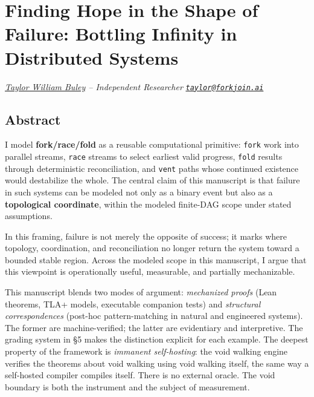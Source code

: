 \documentclass[
  11pt,
]{article}
\author{}
\date{}
\begin{document}
\section{\texorpdfstring{\textbf{Finding Hope in the Shape of Failure}:
Bottling Infinity in Distributed
Systems}{Finding Hope in the Shape of Failure: Bottling Infinity in Distributed Systems}}\label{finding-hope-in-the-shape-of-failure-bottling-infinity-in-distributed-systems}

\emph{\href{https://www.patreon.com/cw/twbuley}{Taylor William Buley} --
Independent Researcher}
\emph{\href{mailto:taylor@forkjoin.ai}{\nolinkurl{taylor@forkjoin.ai}}}

\subsection{Abstract}\label{abstract}

I model \textbf{fork/race/fold} as a reusable computational primitive:
\texttt{fork} work into parallel streams, \texttt{race} streams to
select earliest valid progress, \texttt{fold} results through
deterministic reconciliation, and \texttt{vent} paths whose continued
existence would destabilize the whole. The central claim of this
manuscript is that failure in such systems can be modeled not only as a
binary event but also as a \textbf{topological coordinate}, within the
modeled finite-DAG scope under stated assumptions.

In this framing, failure is not merely the opposite of success; it marks
where topology, coordination, and reconciliation no longer return the
system toward a bounded stable region. Across the modeled scope in this
manuscript, I argue that this viewpoint is operationally useful,
measurable, and partially mechanizable.

This manuscript blends two modes of argument: \emph{mechanized proofs}
(Lean theorems, TLA+ models, executable companion tests) and
\emph{structural correspondences} (post-hoc pattern-matching in natural
and engineered systems). The former are machine-verified; the latter are
evidentiary and interpretive. The grading system in §5 makes the
distinction explicit for each example. The deepest property of the
framework is \emph{immanent self-hosting}: the void walking engine
verifies the theorems about void walking using void walking itself, the
same way a self-hosted compiler compiles itself. There is no external
oracle. The void boundary is both the instrument and the subject of
measurement.
\end{document}
